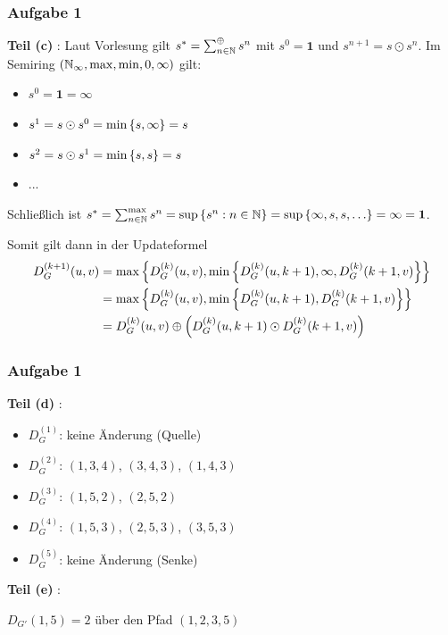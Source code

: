 \documentclass{beamer}
\begin{document}
\begin{frame} \frametitle{Aufgabe 1}
	\textbf{Teil (c)} :
	\small
	Laut Vorlesung gilt $s^\ast = \sum_{n \in \mathbb{N}}^{\oplus} s^n$ mit $s^0 = \mathbf{1}$ und $s^{n+1} = s \odot s^n$. Im Semiring $(\mathbb{N}_\infty, \max, \min, 0, \infty)$ gilt:
	\begin{itemize}
		\item $s^0 = \mathbf{1} = \infty$
		\item $s^1 = s \odot s^0 = \min \left\{ s, \infty \right\} = s$
		\item $s^2 = s \odot s^1 = \min \left\{ s, s \right\} = s$
		\item ...
	\end{itemize}
	Schließlich ist $s^\ast = \sum_{n \in \N}^{\max} s^n = \sup \menge{s^n : n \in \N} = \sup \menge{\infty , s, s, \dots} = \infty = \mathbf{1}$.
	
	Somit gilt dann in der Updateformel 
	\begin{equation*}
	\begin{aligned}
		D_G^{(k+1)}(u,v) &= \max \left\{ D_G^{(k)}(u,v) , \min\left\{ D_G^{(k)}(u,k+1) , \infty, D_G^{(k)}(k+1,v) \right\} \right\} \\
		&=	\max \left\{ D_G^{(k)}(u,v) , \min\left\{ D_G^{(k)}(u,k+1), D_G^{(k)}(k+1,v) \right\} \right\} \\
		&= 	D_G^{(k)}(u,v) \oplus \left( D_G^{(k)}(u,k+1) \odot D_G^{(k)}(k+1,v) \right)
	\end{aligned}
	\end{equation*}
\end{frame}
\begin{frame} \frametitle{Aufgabe 1}
	\textbf{Teil (d)} :
	\begin{itemize}
		\item $D_G^{(1)}$: \hspace{.5em} keine Änderung (Quelle)
		\item $D_G^{(2)}$: \hspace{.5em} $(1,3,4)$, $(3,4,3)$, $(1,4,3)$
		\item $D_G^{(3)}$: \hspace{.5em} $(1,5,2)$, $(2,5,2)$
		\item $D_G^{(4)}$: \hspace{.5em} $(1,5,3)$, $(2,5,3)$, $(3,5,3)$
		\item $D_G^{(5)}$: \hspace{.5em} keine Änderung (Senke)
	\end{itemize}
	
	\pause
	
	\textbf{Teil (e)} :
	
	$D_{G'}(1,5) = 2$ über den Pfad $(1,2,3,5)$
\end{frame}
\end{document}
